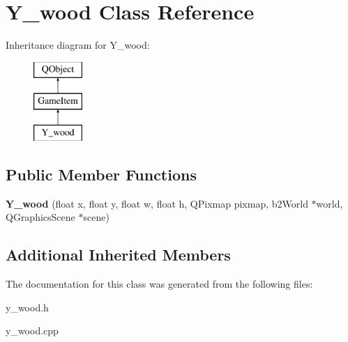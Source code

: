 \hypertarget{classY__wood}{\section{Y\-\_\-wood Class Reference}
\label{classY__wood}
}
Inheritance diagram for Y\-\_\-wood\-:\begin{figure}[H]
\begin{center}
\leavevmode
\includegraphics[height=3.000000cm]{classY__wood}
\end{center}
\end{figure}
\subsection*{Public Member Functions}
\begin{DoxyCompactItemize}
\item 
\hypertarget{classY__wood_ad9a8c0af8aa4d0b4243ac41d3404065a}{{\bfseries Y\-\_\-wood} (float x, float y, float w, float h, Q\-Pixmap pixmap, b2\-World $\ast$world, Q\-Graphics\-Scene $\ast$scene)}\label{classY__wood_ad9a8c0af8aa4d0b4243ac41d3404065a}

\end{DoxyCompactItemize}
\subsection*{Additional Inherited Members}


The documentation for this class was generated from the following files\-:\begin{DoxyCompactItemize}
\item 
y\-\_\-wood.\-h\item 
y\-\_\-wood.\-cpp\end{DoxyCompactItemize}
